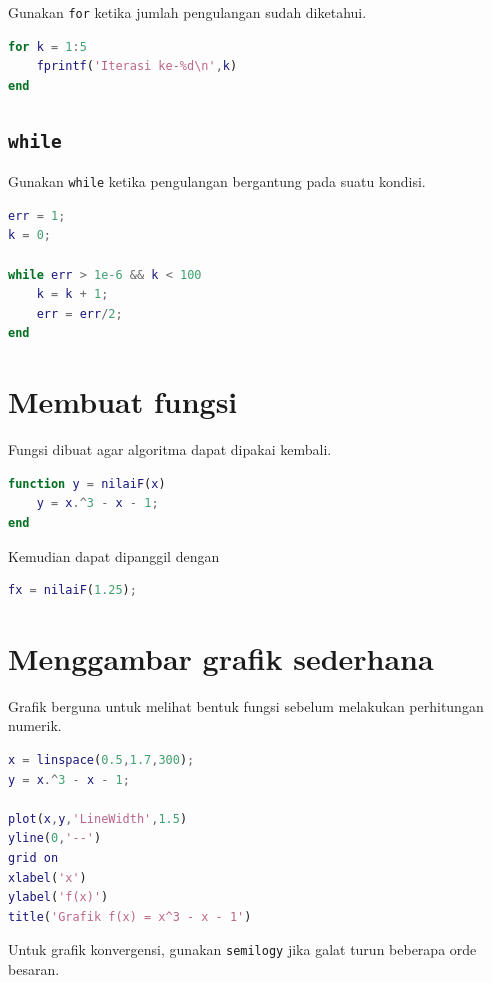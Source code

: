 Gunakan \texttt{for} ketika jumlah pengulangan sudah diketahui.

\begin{lstlisting}[language=Matlab]
for k = 1:5
    fprintf('Iterasi ke-%d\n',k)
end
\end{lstlisting}

\subsection*{\texttt{while}}

Gunakan \texttt{while} ketika pengulangan bergantung pada suatu kondisi.

\begin{lstlisting}[language=Matlab]
err = 1;
k = 0;

while err > 1e-6 && k < 100
    k = k + 1;
    err = err/2;
end
\end{lstlisting}

\section{Membuat fungsi}

Fungsi dibuat agar algoritma dapat dipakai kembali.

\begin{lstlisting}[language=Matlab]
% File: nilaiF.m
function y = nilaiF(x)
    y = x.^3 - x - 1;
end
\end{lstlisting}

Kemudian dapat dipanggil dengan

\begin{lstlisting}[language=Matlab]
fx = nilaiF(1.25);
\end{lstlisting}

\section{Menggambar grafik sederhana}

Grafik berguna untuk melihat bentuk fungsi sebelum melakukan perhitungan numerik.

\begin{lstlisting}[language=Matlab]
x = linspace(0.5,1.7,300);
y = x.^3 - x - 1;

plot(x,y,'LineWidth',1.5)
yline(0,'--')
grid on
xlabel('x')
ylabel('f(x)')
title('Grafik f(x) = x^3 - x - 1')
\end{lstlisting}

Untuk grafik konvergensi, gunakan \texttt{semilogy} jika galat turun beberapa orde besaran.

